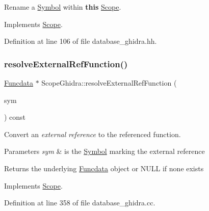 Rename a \mbox{\hyperlink{class_symbol}{Symbol}} within {\bfseries{this}} \mbox{\hyperlink{class_scope}{Scope}}. 



Implements \mbox{\hyperlink{class_scope_ab576de2e768be9507ee03faa163c1ddf}{Scope}}.



Definition at line 106 of file database\+\_\+ghidra.\+hh.

\mbox{\label{class_scope_ghidra_afdb2e6de63033bb78e6c4168c8e25227}} 
\subsubsection{\texorpdfstring{resolveExternalRefFunction()}{resolveExternalRefFunction()}}
{\footnotesize\ttfamily \mbox{\hyperlink{class_funcdata}{Funcdata}} $\ast$ Scope\+Ghidra\+::resolve\+External\+Ref\+Function (\begin{DoxyParamCaption}\item[{\mbox{\hyperlink{class_extern_ref_symbol}{Extern\+Ref\+Symbol}} $\ast$}]{sym }\end{DoxyParamCaption}) const\hspace{0.3cm}{\ttfamily [virtual]}}



Convert an {\itshape external} {\itshape reference} to the referenced function. 


\begin{DoxyParams}{Parameters}
{\em sym} & is the \mbox{\hyperlink{class_symbol}{Symbol}} marking the external reference \\
\hline
\end{DoxyParams}
\begin{DoxyReturn}{Returns}
the underlying \mbox{\hyperlink{class_funcdata}{Funcdata}} object or N\+U\+LL if none exists 
\end{DoxyReturn}


Implements \mbox{\hyperlink{class_scope_af4c45025894f1996ef0f3556752cd997}{Scope}}.



Definition at line 358 of file database\+\_\+ghidra.\+cc.

